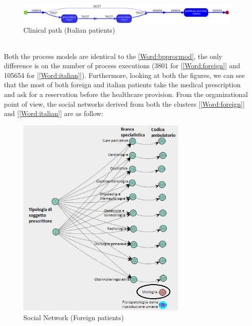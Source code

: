 \begin{figure} [htbp]
\centering
\includegraphics[width=\textwidth , keepaspectratio]{AmbulatoriInductiveVisualMinerItalians}
\caption{Clinical path (Italian patients)}
\end{figure}\\
Both the process models are identical to the \ref{Word:bpprocmod}, the only difference is on the number of process executions (3801 for [\ref{Word:foreign}] and 105654 for [\ref{Word:italian}]). Furthermore, looking at both the figures, we can see that the most of both foreign and italian patients take the medical prescription and ask for a reservation before the healthcare provision. From the organizational point of view, the social networks derived from both the clusters [\ref{Word:foreign}] and [\ref{Word:italian}] are as follow:
\begin{figure} [htbp]
\includegraphics[width=0.75\textwidth, keepaspectratio]{AmbulatoriSocialNetworkForeigns}
\caption{Social Network (Foreign patients)}
\end{figure}
\clearpage
